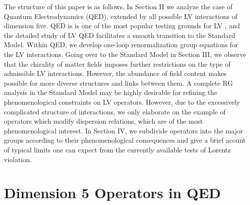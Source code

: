 \documentclass[12pt,preprintnumbers,nofootinbib]{revtex4}
\begin{document}
	The structure of this paper is as follows. In Section II we analyze the case of 
 Quantum Electrodynamics (QED), extended by all possible 
    LV interactions  of dimension five.
QED is is one of the most popular testing grounds for LV
\cite{CFJ,CG,Ted1,MP:,Bolokhov:2005cj}, and the
	detailed study of LV QED facilitates a smooth transition to the Standard Model. 
	Within QED, we develop one-loop renormalization group equations for the LV interactions. 
	Going over to the Standard Model in Section III, we observe that the chirality of matter fields 
    imposes further restrictions on the type of admissible LV interactions. 
	However, the abundance of field content makes possible for more diverse 
	structures and links between them.
	A complete RG analysis in the Standard Model may be highly desirable for 
	refining the phenomenological constraints on LV operators. However, due to the excessively 
	complicated structure of interactions, we only elaborate on the example of 
	operators which modify dispersion relations, which are of the most phenomenological interest.
	In Section IV, we subdivide operators into the major groups according to their phenomenological 
consequences and give a brief acount of typical limits one can expect from the currently available 
tests of Lorentz violation. 
	
	
	

\section{Dimension 5 Operators in QED}
\end{document}
